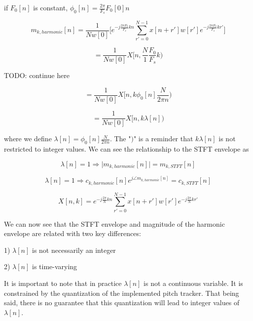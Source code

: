 \documentclass [11pt, proquest] {uwthesis}[2015/03/03]
\begin{document}
if $F_0[n]$ is constant, $\phi_0[n] = \frac{2\pi}{F_s} F_0[0]n$

$$m_{k,harmonic}[n]  = \frac{1}{Nw[0]} \bigg[ e^{-j\frac{2\pi F_0}{F_s} kn} \sum_{r' = 0}^{N-1} x[n + r'] w[r'] e^{-j\frac{2\pi F_0}{F_s} kr'} \bigg]$$

$$= \frac{1}{Nw[0]} X[n, \frac{N}{1} \frac{F_0}{F_s} k)$$


TODO: continue here






$$= \frac{1}{Nw[0]} X[n, k \phi_0[n] \frac{N}{2\pi n})$$

$$= \frac{1}{Nw[0]} X[n, k\lambda[n])$$

where we define $\lambda[n] = \phi_0[n] \frac{N}{2\pi n}$.  The "$)$" is a reminder that $k\lambda [n]$ is not restricted to integer values.  We can see the relationship to the STFT envelope as

$$\lambda[n] = 1 \Rightarrow \vert m_{k,harmonic}[n] \vert = m_{k,STFT}[n]$$

$$\lambda[n] = 1 \Rightarrow c_{k,harmonic}[n]e^{j \angle m_{k,harmonic}[n]} = c_{k,STFT}[n]$$



$$X[n,k] = e^{-j\frac{2\pi}{N}kn} \sum\limits_{r'=0}^{N-1} x[n + r'] w[r'] e^{-j\frac{2\pi}{N}kr'}$$


We can now see that the STFT envelope and magnitude of the harmonic envelope are related with two key differences:

1) $\lambda[n]$ is not necessarily an integer

2) $\lambda[n]$ is time-varying

It is important to note that in practice $\lambda[n]$ is not a continuous variable.  It is constrained by the quantization of the implemented pitch tracker.  That being said, there is no guarantee that this quantization will lead to integer values of $\lambda[n]$.
\end{document}
